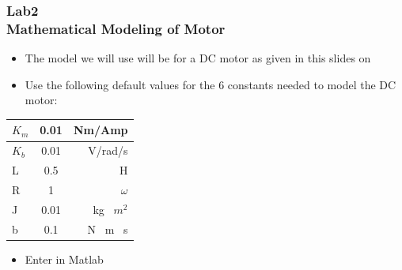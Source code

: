 \documentclass[hyperref={pdfpagelabels=true}]{beamer}
\begin{document}
\begin{frame}
\frametitle{Lab2 \\{\large Mathematical Modeling of Motor}}
\begin{itemize}
\item The model we will use will be for a DC motor as given
in this slides on \hyperlink{motor}{}
\item Use the following default values for the 6 constants needed to
model the DC motor:
\end{itemize}
\begin{center}
  \begin{tabular}{ | l | c | r |}

    \hline
   $K_m$ & 0.01 & Nm/Amp \\ \hline
    $K_b$ & 0.01 & V/rad/s \\ \hline 
    L & 0.5 & H \\ \hline
    R & 1 & $\omega$ \\ \hline
J & 0.01 &kg \ $m^2$ \\ \hline
b &0.1 &N \ m \ s \\
    \hline
  \end{tabular}
\end{center}
\begin{itemize}
\item Enter in Matlab
\end{itemize}

\label{motor1}
\end{frame}
\end{document}
